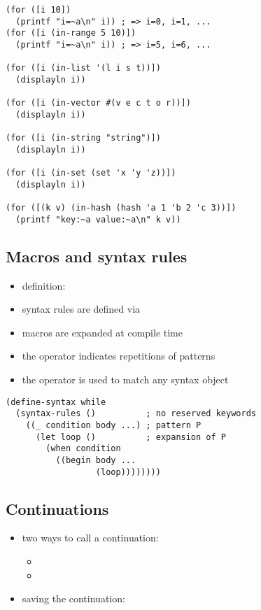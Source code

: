 \documentclass[a4paper,landscape,10pt]{article}
\begin{document}
\begin{multicols*}{2}
  \begin{lstlisting}[language=Racket]
(for ([i 10])
  (printf "i=~a\n" i)) ; => i=0, i=1, ...
(for ([i (in-range 5 10)])
  (printf "i=~a\n" i)) ; => i=5, i=6, ...

(for ([i (in-list '(l i s t))])
  (displayln i))

(for ([i (in-vector #(v e c t o r))])
  (displayln i))

(for ([i (in-string "string")])
  (displayln i))

(for ([i (in-set (set 'x 'y 'z))])
  (displayln i))

(for ([(k v) (in-hash (hash 'a 1 'b 2 'c 3))])
  (printf "key:~a value:~a\n" k v))
  \end{lstlisting}

  \subsection{Macros and syntax rules}

  \begin{itemize}
    \item definition: 
    \item syntax rules are defined via 
    \item macros are expanded at compile time
    \item the  operator indicates repetitions of patterns
    \item the \iracket{_} operator is used to match any syntax object
  \end{itemize}

  \begin{lstlisting}[language=Racket]
(define-syntax while
  (syntax-rules ()          ; no reserved keywords
    ((_ condition body ...) ; pattern P
      (let loop ()          ; expansion of P
        (when condition
          ((begin body ...
                  (loop))))))))
  \end{lstlisting}

  \subsection{Continuations}

  \begin{itemize}
    \item two ways to call a continuation:
          \begin{itemize}
            \item {}
            \item {}
          \end{itemize}
    \item saving the continuation: 
  \end{itemize}


\end{multicols*}
\end{document}
